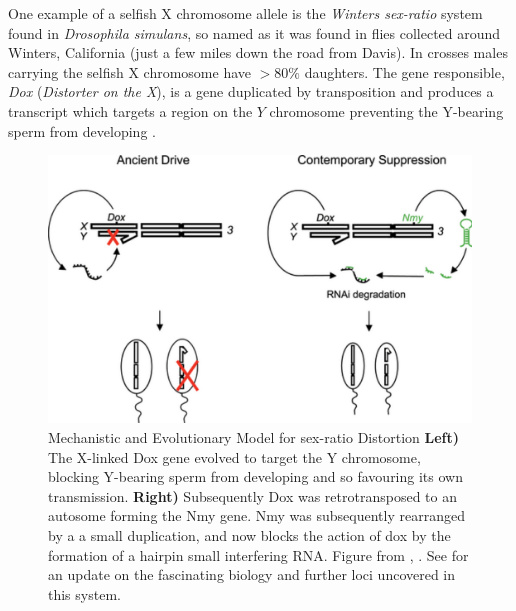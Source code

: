 {One example of a selfish X
chromosome allele is the {\it Winters sex-ratio} system found in {\it Drosophila
  simulans}, so named as it was found in flies collected around Winters, California (just a
few miles down the road from Davis). In crosses males carrying the selfish X
chromosome have  $>80\%$ daughters. The gene
responsible, {\it Dox} ({\it Distorter on the X}), is a gene
duplicated by transposition and produces a transcript which targets a region
on the $Y$ chromosome preventing the Y-bearing sperm from developing
\citet[see Figure \ref{fig:winters_sperm} from][]{tao2007sexII}. 


  \begin{figure}
\begin{center}
\includegraphics[width= \textwidth]{Journal_figs/single_locus_selection/Winters_sex_ratio_drive/Ferree_Barbash_dox_cartoon.png}
\end{center}
\caption{Mechanistic and Evolutionary Model for sex-ratio Distortion
{\bf Left)} The X-linked Dox gene evolved to target the Y chromosome, blocking
Y-bearing sperm from developing and so favouring its own
transmission. {\bf Right)} Subsequently Dox was retrotransposed to an
autosome forming the Nmy gene. Nmy was subsequently rearranged by a
a small duplication, and now blocks the action of dox by the formation
of a hairpin small interfering RNA. Figure from
\citet{ferree2007distorted}, \PLOSccBY. See \citet
{lin2018hprna} for an update on the fascinating biology and further
loci uncovered in this system.} \label{fig:dox_cartoon}
\end{figure}

}
